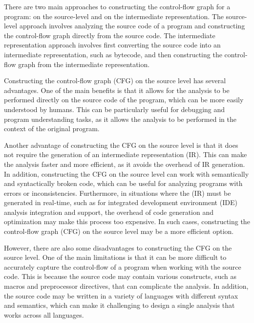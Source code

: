 There are two main approaches to constructing the control-flow graph for a program:
on the source-level and on the intermediate representation. The source-level approach
involves analyzing the source code of a program and constructing the control-flow graph
directly from the source code. The intermediate representation approach involves
first converting the source code into an intermediate representation, such as bytecode,
and then constructing the control-flow graph from the intermediate representation.

Constructing the control-flow graph (CFG) on the source level has several advantages.
One of the main benefits is that it allows for the analysis to be performed directly
on the source code of the program, which can be more easily understood by humans.
This can be particularly useful for debugging and program understanding tasks,
as it allows the analysis to be performed in the context of the original program.

Another advantage of constructing the CFG on the source level is that it does not
require the generation of an intermediate representation (IR). This can make the
analysis faster and more efficient, as it avoids the overhead of IR generation.
In addition, constructing the CFG on the source level can work with semantically
and syntactically broken code, which can be useful for analyzing programs with
errors or inconsistencies.
Furthermore, in situations where the (IR) must be generated in real-time,
such as for integrated development environment (IDE) analysis integration and support,
the overhead of code generation and optimization may make this process too expensive.
In such cases, constructing the control-flow graph (CFG) on the source level
may be a more efficient option.

However, there are also some disadvantages to constructing the CFG on the source level.
One of the main limitations is that it can be more difficult to accurately capture the
control-flow of a program when working with the source code. This is because the source
code may contain various constructs, such as macros and preprocessor directives, that
can complicate the analysis. In addition, the source code may be written in a variety
of languages with different syntax and semantics, which can make it challenging to
design a single analysis that works across all languages.

